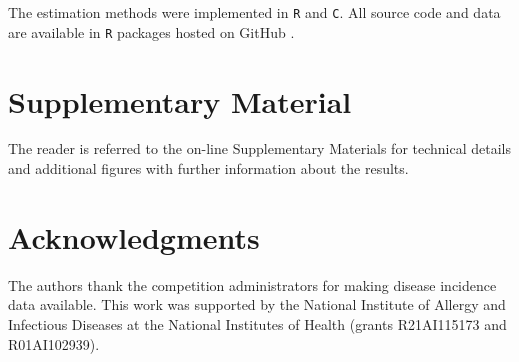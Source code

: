 \documentclass[times, doublespace]{simauth}\usepackage[]{graphicx}\usepackage[]{color}
\begin{document}
The estimation methods were implemented in {\tt R} and {\tt C}.  All source code
and data are available in {\tt R} packages hosted on GitHub
\cite{ReichLabGitHubDiseasePredWithKCDEPackage}.

\section{Supplementary Material}

The reader is referred to the on-line Supplementary Materials for
technical details and additional figures with further information
about the results.

\section*{Acknowledgments}

The authors thank the competition administrators for making disease incidence data
available.  This work was supported by the National Institute of Allergy and
Infectious Diseases at the National Institutes of Health (grants R21AI115173 and
R01AI102939).


%


\end{document}
